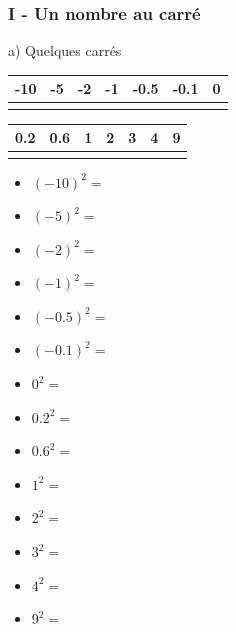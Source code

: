 \documentclass{beamer}
\begin{document}
\begin{frame}
  \frametitle{I - Un nombre au carré}


  \begin{exampleblock}{}
    a) Quelques carrés
  \end{exampleblock}

  \begin{tabular}{| c |  c |  c |  c |    c |    c | c |}
    \hline
    -10 & -5 & -2 & -1 & -0.5 & -0.1 & 0 \\
    \hline
    \phantom{azer} & \phantom{azer} & \phantom{azer} & \phantom{azer} & \phantom{azer} & \phantom{azer} & \phantom{azer} \\       
    \hline
  \end{tabular}

  \begin{tabular}{|   c |   c | c | c | c | c | c |}
    \hline
    0.2 & 0.6 & 1 & 2 & 3 & 4 & 9 \\
    \hline
    \phantom{azer} & \phantom{azer} & \phantom{azer} & \phantom{azer} & \phantom{azer} & \phantom{azer} & \phantom{azer}\\       
    \hline
  \end{tabular}
  
  \begin{multicols}{2}
    \begin{itemize}	
    \item $(-10)^2 = $
    \item $( -5)^2 = $
    \item $( -2)^2 = $
    \item $( -1)^2 = $
    \item $( -0.5)^2 = $
    \item $( -0.1)^2 = $
    \item $ 0^2 = $
    \end{itemize}

    \begin{itemize}	
    \item $0.2^2 = $
    \item $0.6^2 = $
    \item $1^2 = $
    \item $2^2 = $
    \item $3^2 = $
    \item $4^2 = $
    \item $9^2 = $
    \end{itemize}
    
  \end{multicols}
\end{frame}
\end{document}
